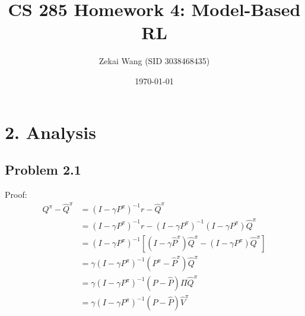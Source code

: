 \documentclass[10pt]{report}
\begin{document}
\title{CS 285 Homework 4: Model-Based RL}
\author{Zekai Wang (SID 3038468435)}
\date{\today}
\maketitle

\section*{2. Analysis}
\subsection*{Problem 2.1}
Proof: 
\begin{align*}
	Q^\pi - \widehat{Q}^\pi &= (I - \gamma P^\pi)^{-1} r - \widehat{Q}^\pi \\
	&= (I - \gamma P^\pi)^{-1} r - (I - \gamma P^\pi)^{-1} (I - \gamma P^\pi) \widehat{Q}^\pi \\
	&= (I - \gamma P^\pi)^{-1} [(I - \gamma \widehat{P}^\pi)\widehat{Q}^\pi - (I - \gamma P^\pi)\widehat{Q}^\pi] \\
	&= \gamma (I - \gamma P^\pi)^{-1} (P^\pi - \widehat{P}^\pi) \widehat{Q}^\pi \\
	&= \gamma (I - \gamma P^\pi)^{-1} (P - \widehat{P}) \Pi \widehat{Q}^\pi \\
	&= \gamma (I - \gamma P^\pi)^{-1} (P - \widehat{P}) \widehat{V}^\pi
\end{align*}
\end{document}
